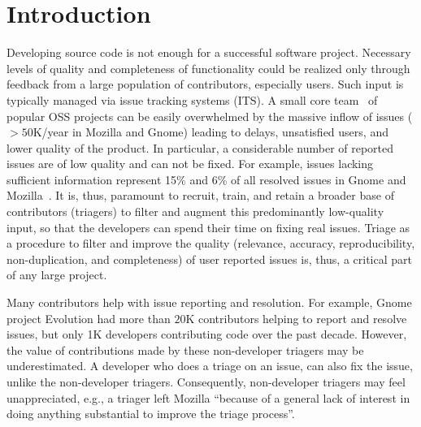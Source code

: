 \documentclass[conference]{IEEEtran}
\begin{document}
\section{Introduction}
Developing source code is not enough for a successful software
project. Necessary levels of quality and completeness of
functionality could be realized only through feedback from a large
population of contributors, especially users. Such input is typically
managed via issue tracking systems (ITS).  A small core team~\cite{MFH02}
of popular OSS projects can be easily overwhelmed by the massive inflow
of issues ($>50$K/year in Mozilla and Gnome) leading to
delays, unsatisfied users, and lower quality of the product.
In particular, a considerable number of reported issues are of low
quality and can not be fixed. For example, issues lacking sufficient
information represent 15\% and 6\% of all resolved issues in Gnome and
Mozilla~\cite{MM12}. It is, thus, paramount to
recruit, train, and retain a broader base of contributors (triagers)
to filter and augment this predominantly low-quality input, so that
the developers can spend their time on fixing real issues. Triage as
a procedure to filter and improve the quality (relevance, accuracy,
reproducibility, non-duplication, and completeness) of user reported
issues is, thus, a critical part of any large project.


Many contributors help with issue reporting and resolution.  For
example, Gnome project Evolution had more than $20$K contributors
helping to report and resolve issues, but only 1K developers
contributing code over the past decade. However, the value of
contributions made by these non-developer triagers may be
underestimated. A developer who does a triage on an issue, can also
fix the issue, unlike the non-developer triagers. Consequently,
non-developer triagers may feel unappreciated, e.g., a triager left
Mozilla ``because of a general lack of interest in doing
  anything substantial to improve the triage
  process''\cite{tdblog}.
\end{document}
